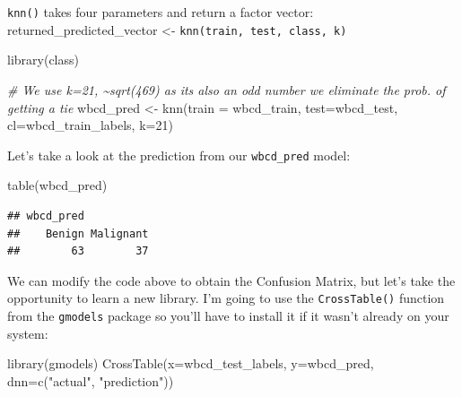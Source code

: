\documentclass[
]{article}
\newenvironment{Shaded}{\begin{snugshade}}{\end{snugshade}}
\newcommand{\AttributeTok}[1]{\textcolor[rgb]{0.77,0.63,0.00}{#1}}
\newcommand{\CommentTok}[1]{\textcolor[rgb]{0.56,0.35,0.01}{\textit{#1}}}
\newcommand{\DecValTok}[1]{\textcolor[rgb]{0.00,0.00,0.81}{#1}}
\newcommand{\FunctionTok}[1]{\textcolor[rgb]{0.00,0.00,0.00}{#1}}
\newcommand{\NormalTok}[1]{#1}
\newcommand{\OtherTok}[1]{\textcolor[rgb]{0.56,0.35,0.01}{#1}}
\newcommand{\StringTok}[1]{\textcolor[rgb]{0.31,0.60,0.02}{#1}}
\begin{document}
\texttt{knn()} takes four parameters and return a factor vector:\\
returned\_predicted\_vector \textless-
\texttt{knn(train,\ test,\ class,\ k)}

\begin{Shaded}
\begin{Highlighting}[]
\FunctionTok{library}\NormalTok{(class)}

\CommentTok{\# We use k=21, \textasciitilde{}sqrt(469) as its also an odd number we eliminate the prob. of getting a tie}
\NormalTok{wbcd\_pred }\OtherTok{\textless{}{-}} \FunctionTok{knn}\NormalTok{(}\AttributeTok{train =}\NormalTok{ wbcd\_train, }\AttributeTok{test=}\NormalTok{wbcd\_test, }\AttributeTok{cl=}\NormalTok{wbcd\_train\_labels, }\AttributeTok{k=}\DecValTok{21}\NormalTok{)}
\end{Highlighting}
\end{Shaded}

Let's take a look at the prediction from our \texttt{wbcd\_pred} model:

\begin{Shaded}
\begin{Highlighting}[]
\FunctionTok{table}\NormalTok{(wbcd\_pred)}
\end{Highlighting}
\end{Shaded}

\begin{verbatim}
## wbcd_pred
##    Benign Malignant 
##        63        37
\end{verbatim}

We can modify the code above to obtain the Confusion Matrix, but let's
take the opportunity to learn a new library. I'm going to use the
\texttt{CrossTable()} function from the \texttt{gmodels} package so
you'll have to install it if it wasn't already on your system:

\begin{Shaded}
\begin{Highlighting}[]
\FunctionTok{library}\NormalTok{(gmodels)}
\FunctionTok{CrossTable}\NormalTok{(}\AttributeTok{x=}\NormalTok{wbcd\_test\_labels, }\AttributeTok{y=}\NormalTok{wbcd\_pred, }\AttributeTok{dnn=}\FunctionTok{c}\NormalTok{(}\StringTok{"actual"}\NormalTok{, }\StringTok{"prediction"}\NormalTok{))}
\end{Highlighting}
\end{Shaded}
\end{document}
